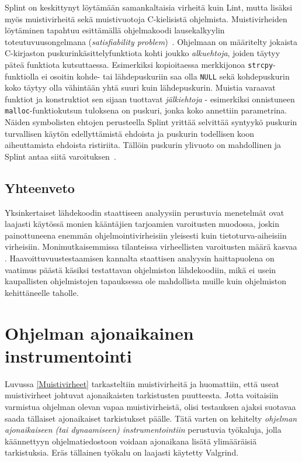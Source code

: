 Splint on keskittynyt löytämään samankaltaisia virheitä kuin Lint,
mutta lisäksi myös muistivirheitä sekä muistivuotoja C-kielisistä ohjelmista.
Muistivirheiden löytäminen tapahtuu esittämällä ohjelmakoodi lausekalkyylin toteutuvuusongelmana
(\emph{satisfiability problem})~\cite{SplintLCLint}.
Ohjelmaan on määritelty jokaista C-kirjaston puskurinkäsittelyfunktiota kohti joukko
\emph{alkuehtoja}, joiden täytyy päteä funktiota kutsuttaessa.
Esimerkiksi kopioitaessa merkkijonoa \texttt{strcpy}-funktiolla ei osoitin kohde- tai lähdepuskuriin
saa olla \texttt{NULL} sekä kohdepuskurin koko täytyy olla vähintään yhtä suuri kuin lähdepuskurin.
Muistia varaavat funktiot ja konstruktiot sen sijaan tuottavat \emph{jälkiehtoja} -
esimerkiksi onnistuneen \texttt{malloc}-funktiokutsun tuloksena on puskuri,
jonka koko annettiin parametrina.
Näiden symbolisten ehtojen perusteella Splint yrittää selvittää syntyykö
puskurin turvallisen käytön edellyttämistä ehdoista ja
puskurin todellisen koon aiheuttamista ehdoista ristiriita.
Tällöin puskurin ylivuoto on mahdollinen ja Splint antaa siitä varoituksen~\cite{SplintLCLint}.

\subsection{Yhteenveto}
Yksinkertaiset lähdekoodin staattiseen analyysiin perustuvia menetelmät ovat laajasti käytössä monien kääntäjien tarjoamien varoitusten muodossa,
joskin painottuneena enemmän ohjelmointivirheisiin yleisesti kuin tietoturva-aiheisiin virheisiin.
Monimutkaisemmissa tilanteissa virheellisten varoitusten määrä kasvaa .
Haavoittuvuustestaamisen kannalta staattisen analyysin haittapuolena on vaatimus päästä käsiksi testattavan ohjelmiston lähdekoodiin,
mikä ei usein kaupallisten ohjelmistojen tapauksessa ole mahdollista muille kuin ohjelmiston kehittäneelle taholle.

\section{Ohjelman ajonaikainen instrumentointi}
\label{DynaaminenInstrumentointi}
Luvussa \ref{Muistivirheet} tarkasteltiin muistivirheitä ja huomattiin,
että useat muistivirheet johtuvat ajonaikaisten tarkistusten puutteesta.
Jotta voitaisiin varmistua ohjelman olevan vapaa muistivirheistä,
olisi testauksen ajaksi suotavaa saada tällaiset ajonaikaiset tarkistukset päälle.
Tätä varten on kehitelty \emph{ohjelman ajonaikaiseen (tai dynaamiseen) instrumentointiin} perustuvia työkaluja,
jolla käännettyyn ohjelmatiedostoon voidaan ajonaikana lisätä ylimääräisiä tarkistuksia.
Eräs tällainen työkalu on laajasti käytetty Valgrind.

